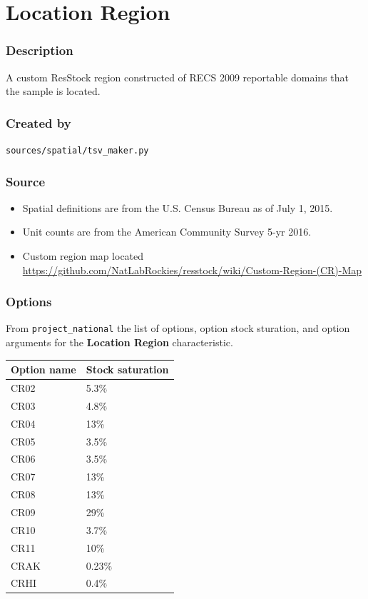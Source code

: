\section{Location Region}\label{location_region}

\subsubsection{Description}\label{description-107}

A custom ResStock region constructed of RECS 2009 reportable domains
that the sample is located.

\subsubsection{Created by}\label{created-by-108}

\texttt{sources/spatial/tsv\_maker.py}

\subsubsection{Source}\label{source-110}

\begin{itemize}
 
\item
  Spatial definitions are from the U.S. Census Bureau as of July 1,
  2015.
\item
  Unit counts are from the American Community Survey 5-yr 2016.
\item
  Custom region map located
  \url{https://github.com/NatLabRockies/resstock/wiki/Custom-Region-(CR)-Map}
\end{itemize}

\subsubsection{Options}\label{options-111}

From \texttt{project\_national} the list of options, option stock
sturation, and option arguments for the \textbf{Location Region}
characteristic.

\begin{longtable}[]{@{}ll@{}}
\toprule\noalign{}
Option name & Stock saturation \\
\midrule\noalign{}
\endhead
\bottomrule\noalign{}
\endlastfoot
CR02 & 5.3\% \\
CR03 & 4.8\% \\
CR04 & 13\% \\
CR05 & 3.5\% \\
CR06 & 3.5\% \\
CR07 & 13\% \\
CR08 & 13\% \\
CR09 & 29\% \\
CR10 & 3.7\% \\
CR11 & 10\% \\
CRAK & 0.23\% \\
CRHI & 0.4\% \\
\end{longtable}

